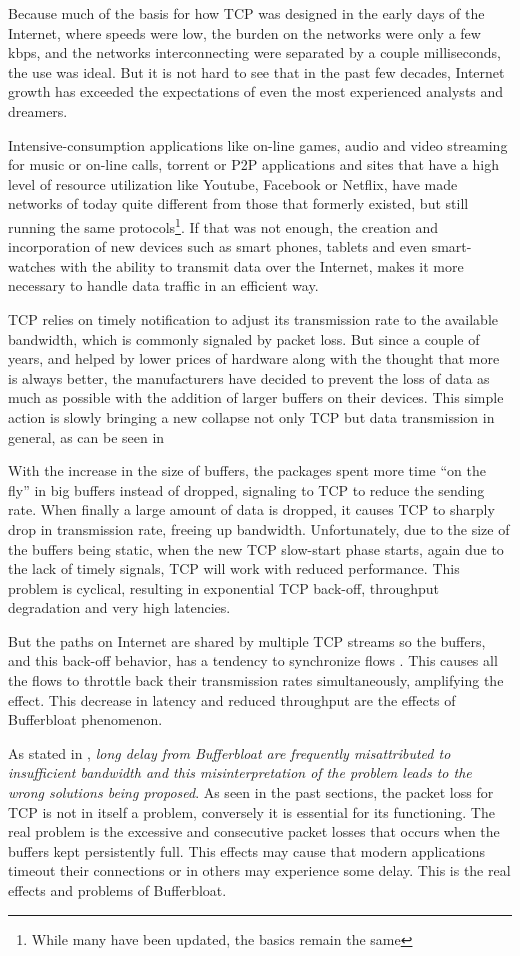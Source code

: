 Because much of the basis for how TCP was designed in the early days of the
Internet, where speeds were low, the burden on the networks were only a few
kbps, and the networks interconnecting were separated by a couple
milliseconds, the use was ideal. But it is not hard to see that in the past
few decades, Internet growth has exceeded the expectations of even the most
experienced analysts and dreamers.

Intensive-consumption applications like on-line games, audio and video
streaming for music or on-line calls, torrent or P2P applications and 
sites that have a high level of resource utilization like Youtube, Facebook or
Netflix, have made networks of today quite different from those that formerly
existed, but still running the same protocols\footnote{While many have been
updated, the basics remain the same}. If that was not enough, the creation and
incorporation of new devices such as smart phones, tablets and even smart-watches
with the ability to transmit data over the Internet, makes it more necessary to handle data traffic in an efficient way.

TCP relies on timely notification to adjust its transmission rate to the
available bandwidth, which is commonly signaled by packet loss. But since a
couple of years, and helped by lower prices of hardware along
with the thought that more is always better, the manufacturers have decided to
prevent the loss of data as much as possible with the addition of larger buffers on
their devices. This simple action is slowly bringing a new collapse not only
TCP but data transmission in general, as can be seen in \cite{CACMStaff}

With the increase in the size of buffers, the packages spent more time
``on the fly'' in big buffers instead of dropped, signaling to TCP to
reduce the sending rate. When finally a large amount of data is dropped,
it causes TCP to
sharply drop in transmission rate, freeing up bandwidth. Unfortunately, due to
the size of the buffers being static, when the new TCP slow-start phase starts,
again due to the lack of timely signals, TCP will work with reduced
performance. This problem is cyclical, resulting in exponential TCP back-off,
throughput degradation and very high latencies.

But the paths on Internet are shared by multiple TCP streams so the buffers,
and this back-off behavior, has a tendency to synchronize flows
 \cite{main:ref:1}. This causes all the flows to throttle back their
transmission rates simultaneously, amplifying the effect. This decrease in
latency and reduced throughput are the effects of Bufferbloat phenomenon.

As stated in \cite{GettysNichols}, \emph{long delay from Bufferbloat are
frequently misattributed to insufficient bandwidth and this misinterpretation
of the problem leads to the wrong solutions being proposed}. As seen in the
past sections, the packet loss for TCP is not in itself a problem, conversely
it is essential for its functioning. The real problem is  the excessive and
consecutive packet losses that occurs when the buffers kept persistently
full. This effects may cause that modern applications timeout their
connections or in others may experience some delay. This is the real
effects and problems of Bufferbloat.
